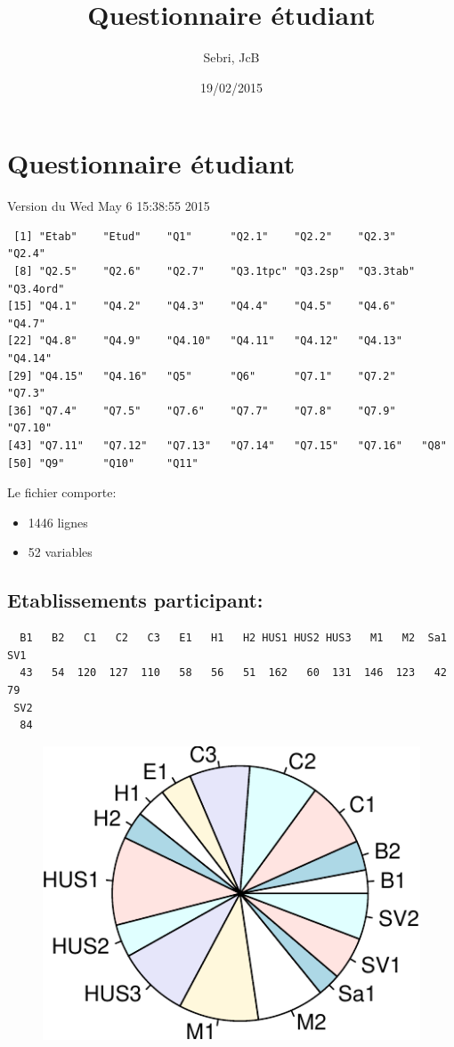 \documentclass[]{article}
\title{Questionnaire étudiant}
\author{Sebri, JcB}
\date{19/02/2015}
\begin{document}
\maketitle


{
\hypersetup{linkcolor=black}
\setcounter{tocdepth}{2}
\tableofcontents
}
\section{Questionnaire étudiant}\label{questionnaire-etudiant}

Version du Wed May 6 15:38:55 2015

\begin{verbatim}
 [1] "Etab"    "Etud"    "Q1"      "Q2.1"    "Q2.2"    "Q2.3"    "Q2.4"   
 [8] "Q2.5"    "Q2.6"    "Q2.7"    "Q3.1tpc" "Q3.2sp"  "Q3.3tab" "Q3.4ord"
[15] "Q4.1"    "Q4.2"    "Q4.3"    "Q4.4"    "Q4.5"    "Q4.6"    "Q4.7"   
[22] "Q4.8"    "Q4.9"    "Q4.10"   "Q4.11"   "Q4.12"   "Q4.13"   "Q4.14"  
[29] "Q4.15"   "Q4.16"   "Q5"      "Q6"      "Q7.1"    "Q7.2"    "Q7.3"   
[36] "Q7.4"    "Q7.5"    "Q7.6"    "Q7.7"    "Q7.8"    "Q7.9"    "Q7.10"  
[43] "Q7.11"   "Q7.12"   "Q7.13"   "Q7.14"   "Q7.15"   "Q7.16"   "Q8"     
[50] "Q9"      "Q10"     "Q11"    
\end{verbatim}

Le fichier comporte:

\begin{itemize}
\itemsep1pt\parskip0pt
\item
  1446 lignes
\item
  52 variables
\end{itemize}

\subsection{Etablissements
participant:}\label{etablissements-participant}

\begin{verbatim}
  B1   B2   C1   C2   C3   E1   H1   H2 HUS1 HUS2 HUS3   M1   M2  Sa1  SV1 
  43   54  120  127  110   58   56   51  162   60  131  146  123   42   79 
 SV2 
  84 
\end{verbatim}

\begin{figure}[htbp]
\centering
\includegraphics{qs_etudiants_files/figure-latex/participants-1.pdf}
\end{figure}
\end{document}
